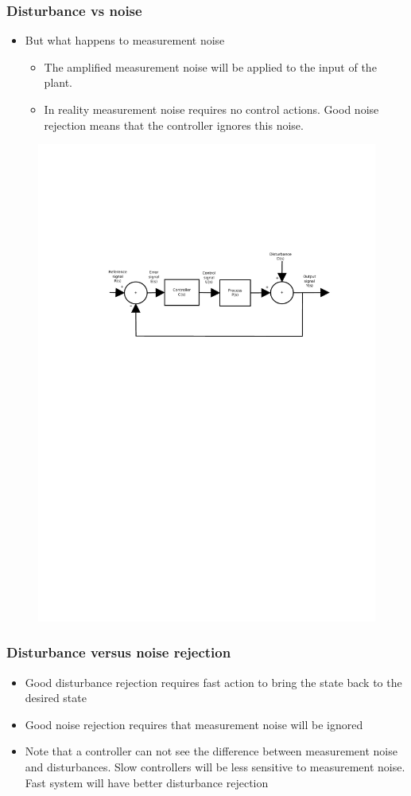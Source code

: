 \begin{frame}
	\frametitle{Disturbance vs noise}
	\begin{itemize}
		\item But what happens to measurement noise
		\begin{itemize}
			\item The amplified measurement noise will be applied to the input of the plant.
			\item In reality measurement noise requires no control actions. Good noise rejection means that the controller ignores this noise.
		\end{itemize}
	\end{itemize}
	\begin{figure}
\centering
\includegraphics[width=0.7\linewidth]{Closed-Loop}
\label{fig:Closed-Loop5}
\end{figure}

\end{frame}


\begin{frame}
	\frametitle{Disturbance versus noise rejection}
	\begin{itemize}
		\item Good disturbance rejection requires fast action to bring the state back to the desired state
		\item Good noise rejection requires that measurement noise will be ignored
		\item Note that a controller can not see the difference between measurement noise and disturbances. Slow controllers will be less sensitive to measurement noise. Fast system will have better disturbance rejection
	\end{itemize}
\end{frame}

